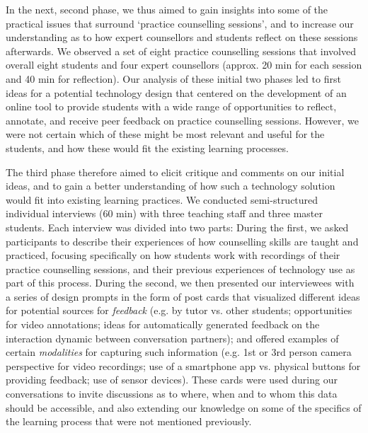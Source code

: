 \documentclass{sigchi}
\begin{document}
In the next, second phase, we thus aimed to gain insights into some of the practical issues that surround `practice counselling sessions', and to increase our understanding as to how expert counsellors and students reflect on these sessions afterwards. We  observed a set of eight practice counselling sessions that involved overall eight students and four expert counsellors (approx. 20 min for each session and 40 min for reflection). Our analysis of these initial two phases led to first ideas for a potential technology design that centered on the development of an online tool to provide students with a wide range of opportunities to reflect, annotate, and receive peer feedback on practice counselling sessions. However, we were not certain which of these might be most relevant and useful for the students, and how these would fit the existing learning processes.

The third phase therefore aimed to elicit critique and comments on our initial ideas, and to gain a better understanding of how such a technology solution would fit into existing learning practices. We conducted semi-structured individual interviews (60 min) with three teaching staff and three master students. Each interview was divided into two parts: During the first, we asked participants to describe their experiences of how counselling skills are taught and practiced, focusing specifically on how students work with recordings of their practice counselling sessions, and their previous experiences of technology use as part of this process. During the second, we then presented our interviewees with a series of design prompts in the form of post cards that visualized different ideas for potential sources for \emph{feedback} (e.g. by tutor vs. other students; opportunities for video annotations; ideas for automatically generated feedback on the interaction dynamic between conversation partners); and offered examples of certain \emph{modalities} for capturing such information (e.g. 1st or 3rd person camera perspective for video recordings; use of a smartphone app vs. physical buttons for providing feedback; use of sensor devices). These cards were used during our conversations to invite discussions as to where, when and to whom this data should be accessible, and also extending our knowledge on some of the specifics of the learning process that were not mentioned previously. 
\end{document}
